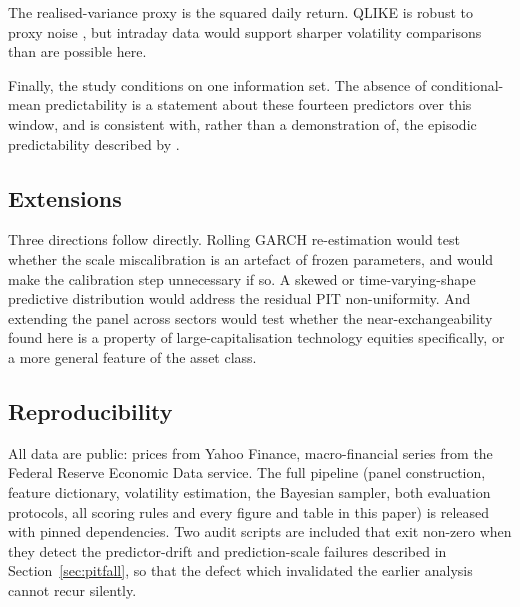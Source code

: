 The realised-variance proxy is the squared daily return. QLIKE is robust to
proxy noise \citep{patton2011volatility}, but intraday data would support sharper
volatility comparisons than are possible here.

Finally, the study conditions on one information set. The absence of
conditional-mean predictability is a statement about these fourteen predictors
over this window, and is consistent with, rather than a demonstration of, the
episodic predictability described by \citet{timmermann2008elusive}.

\subsection{Extensions}

Three directions follow directly. Rolling GARCH re-estimation would test whether
the scale miscalibration is an artefact of frozen parameters, and would make the
calibration step unnecessary if so. A skewed or time-varying-shape predictive
distribution would address the residual PIT non-uniformity. And extending the
panel across sectors would test whether the near-exchangeability found here is a
property of large-capitalisation technology equities specifically, or a more
general feature of the asset class.

\subsection{Reproducibility}

All data are public: prices from Yahoo Finance, macro-financial series from the
Federal Reserve Economic Data service. The full pipeline (panel construction,
feature dictionary, volatility estimation, the Bayesian sampler, both evaluation
protocols, all scoring rules and every figure and table in this
paper) is released with pinned dependencies. Two audit scripts are included
that exit non-zero when they detect the predictor-drift and prediction-scale
failures described in Section~\ref{sec:pitfall}, so that the defect which
invalidated the earlier analysis cannot recur silently.
